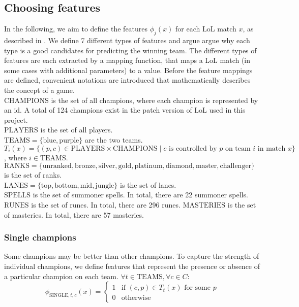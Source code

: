 \subsection{Choosing features}\label{sec:choosingfeatures}
In the following, we aim to define the features $\phi_j(x)$ for each LoL match $x$, as described in .
We define 7 different types of features and argue argue why each type is a good candidates for predicting the winning team.
The different types of features are each extracted by a mapping function, that maps a LoL match (in some cases with additional parameters) to a value. 
Before the feature mappings are defined, convenient notations are introduced that mathematically describes the concept of a game.\\
$\text{CHAMPIONS}$ is the set of all champions, where each champion is represented by an id. A total of 124 champions exist in the patch version of LoL used in this project.\\
$\text{PLAYERS}$ is the set of all players.\\
$\text{TEAMS} = \{\text{blue}, \text{purple}\}$ are the two teams.\\
$T_i(x) = \{ (p, c) \in \text{PLAYERS} \times \text{CHAMPIONS} \mid c \text{ is controlled by } p \text{ on team } i  \text{ in match } x \}$, where $i \in \text{TEAMS}$.\\
$\text{RANKS} = \{\text{unranked},\text{bronze},\text{silver},\text{gold},\text{platinum},\text{diamond},\text{master},\text{challenger}\}$ is the set of ranks.\\
$\text{LANES} = \{\text{top},\text{bottom},\text{mid},\text{jungle}\}$ is the set of lanes.\\
$\text{SPELLS}$ is the set of summoner spells. In total, there are 22 summoner spells.\\
$\text{RUNES}$ is the set of runes. In total, there are 296 runes.
$\text{MASTERIES}$ is the set of masteries. In total, there are 57 masteries.


\subsubsection{Single champions}
Some champions may be better than other champions. To capture the strength of individual champions, we define features that represent the presence or absence of a particular champion on each team.
$\forall t \in \text{TEAMS}, \forall c \in C:$
\begin{equation}\label{eq:single}  
\phi_{\text{SINGLE}, t, c}(x) = 
\begin{cases} 
  1 & \text{if } (c, p) \in T_t(x) \text{ for some } p \\
  0 & \text{otherwise} 
\end{cases}
\end{equation}

